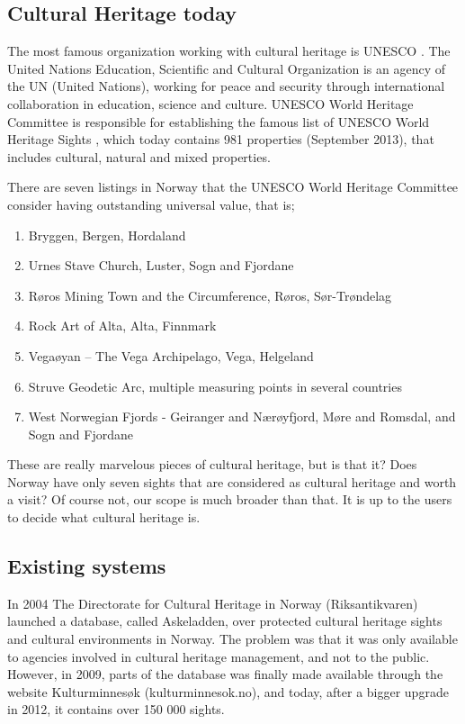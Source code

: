 \documentclass[11pt]{book}
\begin{document}
\subsection{Cultural Heritage today}
The most famous organization working with cultural heritage is UNESCO \cite{UNESCO:intro}. The United Nations Education, Scientific and Cultural Organization is an agency of the UN (United Nations), working for peace and security through international collaboration in education, science and culture. UNESCO World Heritage Committee is responsible for establishing  the famous list of UNESCO World Heritage Sights \cite{UNESCO:worldheritage}, which today contains 981 properties (September 2013), that includes cultural, natural and mixed properties.

There are seven listings in Norway that the UNESCO World Heritage Committee consider having outstanding universal value, that is;

\begin{enumerate}
  \item Bryggen, Bergen, Hordaland
  \item Urnes Stave Church, Luster, Sogn and Fjordane
  \item Røros Mining Town and the Circumference, Røros, Sør-Trøndelag
  \item Rock Art of Alta, Alta, Finnmark
  \item Vegaøyan -- The Vega Archipelago, Vega, Helgeland
  \item Struve Geodetic Arc, multiple measuring points in several countries
  \item West Norwegian Fjords - Geiranger and Nærøyfjord, Møre and Romsdal, and Sogn and Fjordane
\end{enumerate}

These are really marvelous pieces of cultural heritage, but is that it? Does Norway have only seven sights that are considered as cultural heritage and worth a visit? Of course not, our scope is much broader than that. It is up to the users to decide what cultural heritage is.

\subsection{Existing systems}
In 2004 The Directorate for Cultural Heritage in Norway (Riksantikvaren) launched a database, called Askeladden, over protected cultural heritage sights and cultural environments in Norway. The problem was that it was only available to agencies involved in cultural heritage management, and not to the public. However,  in 2009, parts of the database was finally made available through the website Kulturminnesøk (kulturminnesok.no), and today, after a bigger upgrade in 2012, it contains over 150 000 sights.
\end{document}
